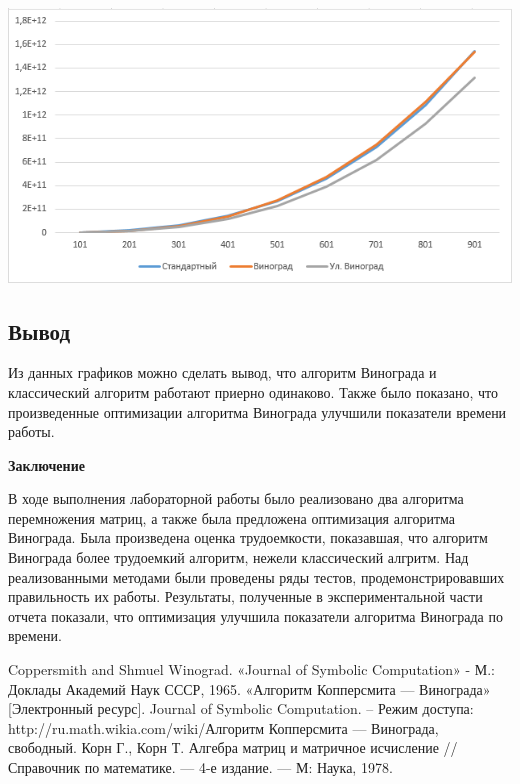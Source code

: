 \documentclass[12pt,a4paper]{scrartcl}
\begin{document}
\begin{center}
	\includegraphics[scale=0.65]{time1.png}
	\label{fig:time1}
\end{center}

\subsection{Вывод}
\label{sec:exp:conclusion}

Из данных графиков можно сделать вывод, что алгоритм Винограда и классический алгоритм работают приерно одинаково. Также было показано, что произведенные оптимизации алгоритма Винограда улучшили показатели времени работы. 

\newpage
\begin{center}
	\textbf{Заключение}
	\label{sec:outro}
\end{center}

В ходе выполнения лабораторной работы было реализовано два алгоритма перемножения матриц, а также была предложена оптимизация алгоритма Винограда.
Была произведена оценка трудоемкости, показавшая, что алгоритм Винограда более трудоемкий алгоритм, нежели классический алгритм.
Над реализованными методами были проведены ряды тестов, продемонстрировавших правильность их работы. 
Результаты, полученные в экспериментальной части отчета показали, что оптимизация улучшила показатели алгоритма Винограда по времени.  

\newpage
\begin{thebibliography}{9}
	 Coppersmith and Shmuel Winograd. «Journal of Symbolic Computation» - М.:  Доклады Академий Наук СССР, 1965.
	 «Алгоритм Копперсмита — Винограда» [Электронный ресурс]. Journal of Symbolic Computation. – Режим доступа:
	http://ru.math.wikia.com/wiki/Алгоритм Копперсмита — Винограда, свободный.	
	 Корн Г., Корн Т. Алгебра матриц и матричное исчисление // Справочник по математике. — 4-е издание. — М: Наука, 1978.  
\end{thebibliography}
\end{document}
